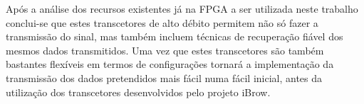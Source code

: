 \begin{enumerate}
	\hspace{1.0em}Após a análise dos recursos existentes já na FPGA a ser utilizada neste trabalho conclui-se que estes transcetores de alto débito permitem não só fazer a transmissão do sinal, mas também incluem técnicas de recuperação fiável dos mesmos dados transmitidos. Uma vez que estes transcetores são também bastantes flexíveis em termos de configurações tornará a implementação da transmissão dos dados pretendidos mais fácil numa fácil inicial, antes da utilização dos transcetores desenvolvidos pelo projeto iBrow. 
\end{enumerate}